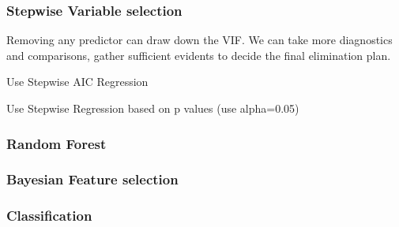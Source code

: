\documentclass[numbered]{trbunofficial}
\begin{document}
\hypertarget{stepwise-variable-selection}{%
\subsubsection{Stepwise Variable selection}\label{stepwise-variable-selection}}

Removing any predictor can draw down the VIF. We can take more diagnostics and comparisons, gather sufficient evidents to decide the final elimination plan.

Use Stepwise AIC Regression

Use Stepwise Regression based on p values (use alpha=0.05)

\hypertarget{random-forest}{%
\subsubsection{Random Forest}\label{random-forest}}

\hypertarget{bayesian-feature-selection}{%
\subsubsection{Bayesian Feature selection}\label{bayesian-feature-selection}}

\hypertarget{classification}{%
\subsubsection{Classification}\label{classification}}
\end{document}
